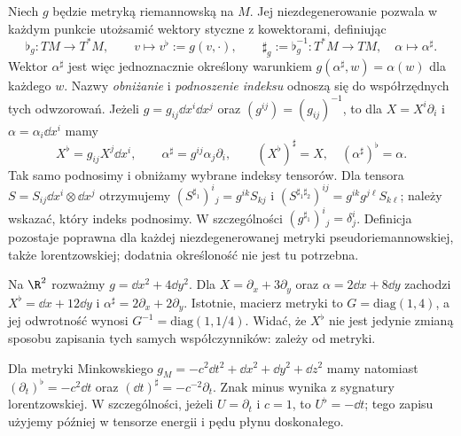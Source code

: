 \begin{definicja}
\label{def:izomorfizmy-muzyczne}
Niech $g$ będzie metryką riemannowską na $M$.
Jej niezdegenerowanie pozwala w każdym punkcie utożsamić
wektory styczne z kowektorami, definiując
\begin{equation}\label{eq:muzyczne-flat-sharp}
 \flat_g\colon TM\longrightarrow T^*M,\qquad
 v\longmapsto v^\flat:=g(v,\cdot),\qquad
 \sharp_g:=\flat_g^{-1}\colon T^*M\longrightarrow TM,
 \quad \alpha\longmapsto\alpha^\sharp.
\end{equation}
Wektor $\alpha^\sharp$ jest więc jednoznacznie określony
warunkiem $g(\alpha^\sharp,w)=\alpha(w)$ dla każdego $w$.
Nazwy \emph{obniżanie} i \emph{podnoszenie indeksu}
odnoszą się do współrzędnych tych odwzorowań.
Jeżeli $g=g_{ij}\dd x^i\dd x^j$ oraz
$(g^{ij})=(g_{ij})^{-1}$, to dla
$X=X^i\partial_i$ i $\alpha=\alpha_i\dd x^i$ mamy
\begin{equation}\label{eq:muzyczne-wspolrzedne}
 X^\flat=g_{ij}X^j\dd x^i,\qquad
 \alpha^\sharp=g^{ij}\alpha_j\partial_i,
 \qquad (X^\flat)^\sharp=X,\quad
 (\alpha^\sharp)^\flat=\alpha.
\end{equation}
Tak samo podnosimy i obniżamy wybrane indeksy tensorów.
Dla tensora $S=S_{ij}\dd x^i\otimes\dd x^j$ otrzymujemy
$(S^{\sharp_1})^i{}_j=g^{ik}S_{kj}$ i
$(S^{\sharp_1\sharp_2})^{ij}=g^{ik}g^{j\ell}S_{k\ell}$;
należy wskazać, który indeks podnosimy.
W szczególności $(g^{\sharp_1})^i{}_j=\delta^i_j$.
Definicja pozostaje poprawna dla każdej niezdegenerowanej
metryki pseudoriemannowskiej, także lorentzowskiej;
dodatnia określoność nie jest tu potrzebna.
\end{definicja}

\begin{przyklad}
\label{prz:izomorfizmy-muzyczne}
Na $\R^2$ rozważmy $g=\dd x^2+4\dd y^2$.
Dla $X=\partial_x+3\partial_y$ oraz
$\alpha=2\dd x+8\dd y$ zachodzi
$X^\flat=\dd x+12\dd y$ i
$\alpha^\sharp=2\partial_x+2\partial_y$.
Istotnie, macierz metryki to $G=\mathrm{diag}(1,4)$,
a jej odwrotność wynosi $G^{-1}=\mathrm{diag}(1,1/4)$.
Widać, że $X^\flat$ nie jest jedynie zmianą sposobu
zapisania tych samych współczynników: zależy od metryki.

Dla metryki Minkowskiego
$g_M=-c^2\dd t^2+\dd x^2+\dd y^2+\dd z^2$ mamy natomiast
$(\partial_t)^\flat=-c^2\dd t$ oraz
$(\dd t)^\sharp=-c^{-2}\partial_t$.
Znak minus wynika z sygnatury lorentzowskiej.
W szczególności, jeżeli $U=\partial_t$ i $c=1$,
to $U^\flat=-\dd t$; tego zapisu użyjemy
później w tensorze energii i pędu płynu doskonałego.
\end{przyklad}

